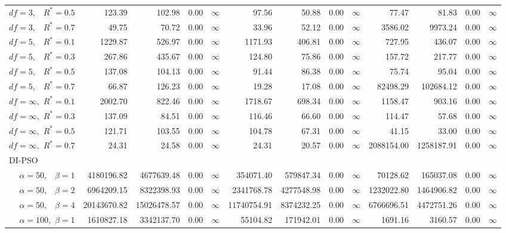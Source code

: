 \documentclass[12pt]{article}
\begin{document}
\begin{table}[ht]
{\begin{tabular}{r|rrrr|rrrr|rrrr}
  $df = 3,\enspace$ $R^* =0.5$ & 123.39 & 102.98 & 0.00 & $\infty$ & 97.56 & 50.88 & 0.00 & $\infty$ & 77.47 & 81.83 & 0.00 & $\infty$ \\ 
  $df = 3,\enspace$ $R^* =0.7$ & 49.75 & 70.72 & 0.00 & $\infty$ & 33.96 & 52.12 & 0.00 & $\infty$ & 3586.02 & 9973.24 & 0.00 & $\infty$ \\ 
  $df = 5,\enspace$ $R^* =0.1$ & 1229.87 & 526.97 & 0.00 & $\infty$ & 1171.93 & 406.81 & 0.00 & $\infty$ & 727.95 & 436.07 & 0.00 & $\infty$ \\ 
  $df = 5,\enspace$ $R^* =0.3$ & 267.86 & 435.67 & 0.00 & $\infty$ & 124.80 & 75.86 & 0.00 & $\infty$ & 157.72 & 217.77 & 0.00 & $\infty$ \\ 
  $df = 5,\enspace$ $R^* =0.5$ & 137.08 & 104.13 & 0.00 & $\infty$ & 91.44 & 86.38 & 0.00 & $\infty$ & 75.74 & 95.04 & 0.00 & $\infty$ \\ 
  $df = 5,\enspace$ $R^* =0.7$ & 66.87 & 126.23 & 0.00 & $\infty$ & 19.28 & 17.08 & 0.00 & $\infty$ & 82498.29 & 102684.12 & 0.00 & $\infty$ \\ 
  $df = \infty,$ $R^* =0.1$ & 2002.70 & 822.46 & 0.00 & $\infty$ & 1718.67 & 698.34 & 0.00 & $\infty$ & 1158.47 & 903.16 & 0.00 & $\infty$ \\ 
  $df = \infty,$ $R^* =0.3$ & 137.09 & 84.51 & 0.00 & $\infty$ & 116.46 & 66.60 & 0.00 & $\infty$ & 114.47 & 57.68 & 0.00 & $\infty$ \\ 
  $df = \infty,$ $R^* =0.5$ & 121.71 & 103.55 & 0.00 & $\infty$ & 104.78 & 67.31 & 0.00 & $\infty$ & 41.15 & 33.00 & 0.00 & $\infty$ \\ 
  $df = \infty,$ $R^* =0.7$ & 24.31 & 24.58 & 0.00 & $\infty$ & 24.31 & 20.57 & 0.00 & $\infty$ & 2088154.00 & 1258187.91 & 0.00 & $\infty$ \\ 
\hline
\multicolumn{1}{l|}{DI-PSO} &&&&&&&&&&&&\\
  $\alpha = 50,\enspace$ $\beta =1$ & 4180196.82 & 4677639.48 & 0.00 & $\infty$ & 354071.40 & 579847.34 & 0.00 & $\infty$ & 70128.62 & 165037.08 & 0.00 & $\infty$ \\ 
  $\alpha = 50,\enspace$ $\beta =2$ & 6964209.15 & 8322398.93 & 0.00 & $\infty$ & 2341768.78 & 4277548.98 & 0.00 & $\infty$ & 1232022.80 & 1464906.82 & 0.00 & $\infty$ \\ 
  $\alpha = 50,\enspace$ $\beta =4$ & 20143670.82 & 15026478.57 & 0.00 & $\infty$ & 11740754.91 & 8374232.25 & 0.00 & $\infty$ & 6766696.51 & 4472751.26 & 0.00 & $\infty$ \\ 
  $\alpha = 100,$ $\beta =1$ & 1610827.18 & 3342137.70 & 0.00 & $\infty$ & 55104.82 & 171942.01 & 0.00 & $\infty$ & 1691.16 & 3160.57 & 0.00 & $\infty$ \\ 

\end{tabular}}
\end{table}
\end{document}
